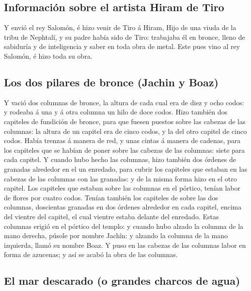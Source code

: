 \hypertarget{informaciuxf3n-sobre-el-artista-hiram-de-tiro}{%
\subsection{Información sobre el artista Hiram de
Tiro}\label{informaciuxf3n-sobre-el-artista-hiram-de-tiro}}

 Y envió el rey Salomón, é hizo venir de Tiro á Hiram,
 Hijo de una viuda de la tribu de Nephtalí, y su padre
había sido de Tiro: trabajaba él en bronce, lleno de sabiduría y de
inteligencia y saber en toda obra de metal. Este pues vino al rey
Salomón, é hizo toda su obra.

\hypertarget{los-dos-pilares-de-bronce-jachin-y-boaz}{%
\subsection{Los dos pilares de bronce (Jachin y
Boaz)}\label{los-dos-pilares-de-bronce-jachin-y-boaz}}

 Y vació dos columnas de bronce, la altura de cada cual era
de diez y ocho codos: y rodeaba á una y á otra columna un hilo de doce
codos.  Hizo también dos capiteles de fundición de bronce,
para que fuesen puestos sobre las cabezas de las columnas: la altura de
un capitel era de cinco codos, y la del otro capitel de cinco codos.
 Había trenzas á manera de red, y unas cintas á manera de
cadenas, para los capiteles que se habían de poner sobre las cabezas de
las columnas: siete para cada capitel.  Y cuando hubo hecho
las columnas, hizo también dos órdenes de granadas alrededor en el un
enredado, para cubrir los capiteles que estaban en las cabezas de las
columnas con las granadas: y de la misma forma hizo en el otro capitel.
 Los capiteles que estaban sobre las columnas en el
pórtico, tenían labor de flores por cuatro codos.  Tenían
también los capiteles de sobre las dos columnas, doscientas granadas en
dos órdenes alrededor en cada capitel, encima del vientre del capitel,
el cual vientre estaba delante del enredado.  Estas
columnas erigió en el pórtico del templo: y cuando hubo alzado la
columna de la mano derecha, púsole por nombre Jachîn: y alzando la
columna de la mano izquierda, llamó su nombre Boaz.  Y puso
en las cabezas de las columnas labor en forma de azucenas; y así se
acabó la obra de las columnas.

\hypertarget{el-mar-descarado-o-grandes-charcos-de-agua}{%
\subsection{El mar descarado (o grandes charcos de
agua)}\label{el-mar-descarado-o-grandes-charcos-de-agua}}


